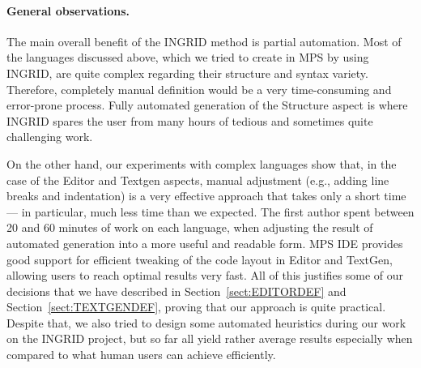 \paragraph{General observations.}
The main overall benefit of the INGRID method is partial automation.
Most of the languages discussed above, which we tried to create in MPS by using INGRID, are quite complex regarding their structure and syntax variety.
Therefore, completely manual definition would be a very time-consuming and error-prone process.
Fully automated generation of the Structure aspect is where INGRID spares the user from many hours of tedious and sometimes quite challenging work.

On the other hand, our experiments with complex languages show that, in the case of the Editor and Textgen aspects, manual adjustment (e.g., adding line breaks and indentation) is a very effective approach that takes only a short time --- in particular, much less time than we expected.
The first author spent between 20 and 60 minutes of work on each language, when adjusting the result of automated generation into a more useful and readable form.
MPS IDE provides good support for efficient tweaking of the code layout in Editor and TextGen, allowing users to reach optimal results very fast.
All of this justifies some of our decisions that we have described in Section~\ref{sect:EDITORDEF} and Section~\ref{sect:TEXTGENDEF}, proving that our approach is quite practical.
Despite that, we also tried to design some automated heuristics during our work on the INGRID project, but so far all yield rather average results especially when compared to what human users can achieve efficiently.

